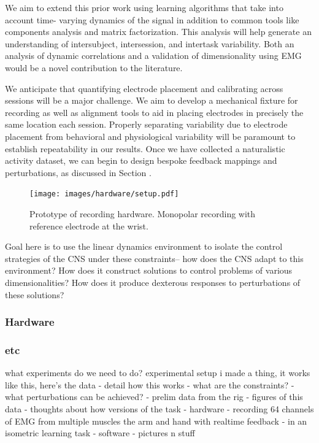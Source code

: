 \documentclass[
  a4paper,
]{article}
\makeatletter
\newcounter{figno}
\newenvironment{fignos:no-prefix-figure-caption}{
  \caption@ifcompatibility{}{
    \let\oldthefigure\thefigure
    \let\oldtheHfigure\theHfigure
    \renewcommand{\thefigure}{figno:\thefigno}
    \renewcommand{\theHfigure}{figno:\thefigno}
    \stepcounter{figno}
    \captionsetup{labelformat=empty}
  }
}{
  \caption@ifcompatibility{}{
    \captionsetup{labelformat=default}
    \let\thefigure\oldthefigure
    \let\theHfigure\oldtheHfigure
    \addtocounter{figure}{-1}
  }
}
\makeatother
\begin{document}
We aim to extend this prior work using learning algorithms that take
into account time- varying dynamics of the signal in addition to common
tools like components analysis and matrix factorization. This analysis
will help generate an understanding of intersubject, intersession, and
intertask variability. Both an analysis of dynamic correlations and a
validation of dimensionality using EMG would be a novel contribution to
the literature.

We anticipate that quantifying electrode placement and calibrating
across sessions will be a major challenge. We aim to develop a
mechanical fixture for recording as well as alignment tools to aid in
placing electrodes in precisely the same location each session. Properly
separating variability due to electrode placement from behavioral and
physiological variability will be paramount to establish repeatability
in our results. Once we have collected a naturalistic activity dataset,
we can begin to design bespoke feedback mappings and perturbations, as
discussed in Section .

\begin{fignos:no-prefix-figure-caption}

\begin{figure}
\centering
\texttt{[image: images/hardware/setup.pdf]}
\caption{Prototype of recording hardware. Monopolar recording with
reference electrode at the wrist.}
\end{figure}

\end{fignos:no-prefix-figure-caption}

Goal here is to use the linear dynamics environment to isolate the
control strategies of the CNS under these constraints-- how does the CNS
adapt to this environment? How does it construct solutions to control
problems of various dimensionalities? How does it produce dexterous
responses to perturbations of these solutions?

\hypertarget{hardware}{%
\subsubsection{Hardware}\label{hardware}}

\hypertarget{etc}{%
\subsubsection{etc}\label{etc}}

what experiments do we need to do? experimental setup i made a thing, it
works like this, here's the data - detail how this works - what are the
constraints? - what perturbations can be achieved? - prelim data from
the rig - figures of this data - thoughts about how versions of the task
- hardware - recording 64 channels of EMG from multiple muscles the arm
and hand with realtime feedback - in an isometric learning task -
software - pictures n stuff
\end{document}
